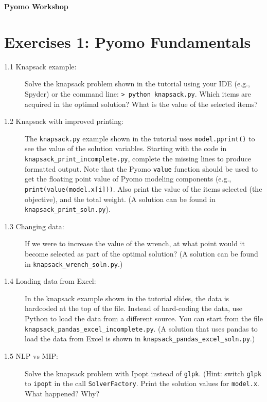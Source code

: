 \documentclass[12pt]{article}
\begin{document}
\textbf{\Large Pyomo Workshop}

\section*{Exercises 1: Pyomo Fundamentals}

\begin{description}
\item[1.1 Knapsack example:] Solve the knapsack problem shown in the tutorial using your IDE (e.g., Spyder) or the command line: {\tt > python knapsack.py}. Which items are acquired in the optimal solution? What is the value of the selected items?
  
\item[1.2 Knapsack with improved printing:] 
  The {\tt knapsack.py} example shown in the tutorial uses {\tt model.pprint()} to see the value of the solution variables. Starting with the code in {\tt knapsack\_print\_incomplete.py}, complete the missing lines to produce formatted output. Note that the Pyomo {\tt value} function should be used to get the floating point value of Pyomo modeling components (e.g., {\tt print(value(model.x[i]))}. Also print the value of the items selected (the objective), and the total weight. (A solution can be found in {\tt knapsack\_print\_soln.py}).

\item[1.3 Changing data:]
  If we were to increase the value of the wrench, at what point would it become selected as part of the optimal solution?
  (A solution can be found in {\tt knapsack\_wrench\_soln.py}.)

\item[1.4 Loading data from Excel:] In the knapsack example shown in the tutorial slides, the data is hardcoded at the top of the file. Instead of hard-coding the data,
  use Python to load the data from a different source. You can start from the file  {\tt knapsack\_pandas\_excel\_incomplete.py}. (A solution that uses pandas to load the data from Excel is shown in {\tt knapsack\_pandas\_excel\_soln.py}.)
  
\item[1.5 NLP vs MIP:] Solve the knapsack problem with {\sc Ipopt} instead of {\tt glpk}. (Hint: switch {\tt glpk} to {\tt ipopt} in the call {\tt SolverFactory}. Print the solution values for {\tt model.x}. What happened? Why? 
\end{description}

\newpage
\end{document}
